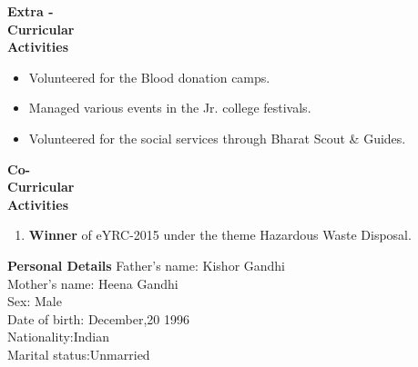 \documentclass{article}
\begin{document}
	     	 	
	     \begin{flushleft} 
	     	\vspace{0.4in}
	     	\textbf{Extra - \\Curricular \\Activities }
	     	\begin{itemize}
	     		\vspace{-0.65in}
	     		\addtolength{\itemindent}{1.359in}
	     		\item  Volunteered for the Blood donation camps.
	     		\item  Managed various events in the Jr. college festivals.
	     		\item  Volunteered for the social services through Bharat Scout \& Guides.  
	     		
	     	\end{itemize}
	     \end{flushleft}
	     
	   \begin{flushleft} 
	      	\vspace{0.4in}
	      	\textbf{Co- \\Curricular \\Activities }
	      	\begin{enumerate}
	      		\vspace{-0.65in}
	      		\addtolength{\itemindent}{1.359in}
	      		\item  \textbf{Winner} of eYRC-2015 under the theme Hazardous Waste Disposal. 
	      	\end{enumerate}
	      \end{flushleft}
	      
	    \begin{flushleft}
	      	\vspace{0.4in}
	      	\textbf{Personal Details} \hspace{0.36in}Father's name: \hspace{0.13in} Kishor Gandhi \\
	      	\hspace{1.55in}Mother's name: \hspace{0.08in} Heena Gandhi\\
	      	\hspace{1.55in}Sex:\hspace{0.85in} Male\\
	      	\hspace{1.55in}Date of birth:\hspace{0.255in} December,20 1996	\\
	      	\hspace{1.55in}Nationality:\hspace{0.45in}Indian\\
	      	\hspace{1.55in}Marital status:\hspace{0.28in}Unmarried
	      	
	      \end{flushleft}
	
\end{document}
